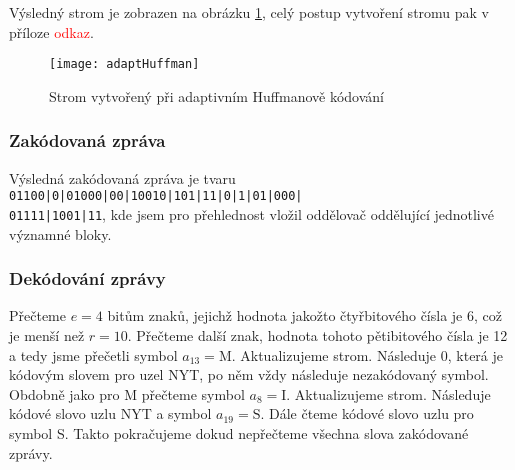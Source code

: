 Výsledný strom je zobrazen na obrázku \ref{adaptivniHuffmanStrom}, celý postup vytvoření stromu pak v příloze \textcolor{red}{odkaz}. 

\begin{figure}[!htb]
\centering
\texttt{[image: adaptHuffman]}
\caption{Strom vytvořený při adaptivním Huffmanově kódování}
\label{adaptivniHuffmanStrom}
\end{figure}

\subsubsection{Zakódovaná zpráva}
Výsledná zakódovaná zpráva je tvaru \texttt{01100|0|01000|00|10010|101|11|0|1|01|000|\\01111|1001|11}, kde jsem pro přehlednost vložil oddělovač \uv{\texttt{|}} oddělující jednotlivé vý\-zna\-mné bloky.

\subsubsection{Dekódování zprávy}
Přečteme $e=4$ bitům znaků, jejichž hodnota jakožto čtyřbitového čísla je 6, což je menší než $r=10$. Přečteme další znak, hodnota tohoto pětibitového čísla je 12 a tedy jsme přečetli symbol $a_{13} = \mathrm{M}$. Aktualizujeme strom. Následuje 0, která je kódovým slovem pro uzel NYT, po něm vždy následuje nezakódovaný symbol. Obdobně jako pro M přečteme symbol $a_8 = \mathrm{I}$. Aktualizujeme strom. Následuje kódové slovo uzlu NYT a symbol $a_{19} = \mathrm{S}$. Dále čteme kódové slovo uzlu pro symbol S. Takto pokračujeme dokud nepřečteme všechna slova zakódované zprávy.